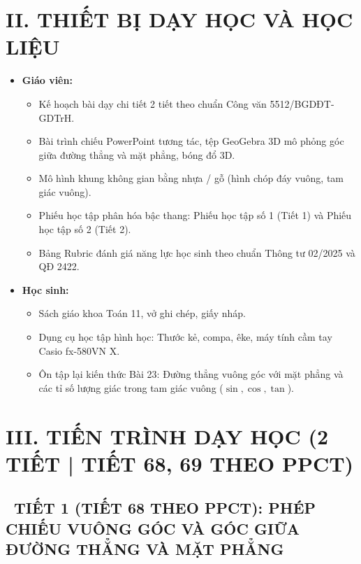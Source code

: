 \documentclass[12pt, a4paper]{article}
\begin{document}
\vspace{5pt}

\section*{II. THIẾT BỊ DẠY HỌC VÀ HỌC LIỆU}

\begin{itemize}[leftmargin=1.2cm]
    \item \textbf{Giáo viên:}
    \begin{itemize}[leftmargin=0.6cm]
        \item Kế hoạch bài dạy chi tiết 2 tiết theo chuẩn Công văn 5512/BGDĐT-GDTrH.
        \item Bài trình chiếu PowerPoint tương tác, tệp GeoGebra 3D mô phỏng góc giữa đường thẳng và mặt phẳng, bóng đổ 3D.
        \item Mô hình khung không gian bằng nhựa / gỗ (hình chóp đáy vuông, tam giác vuông).
        \item Phiếu học tập phân hóa bậc thang: Phiếu học tập số 1 (Tiết 1) và Phiếu học tập số 2 (Tiết 2).
        \item Bảng Rubric đánh giá năng lực học sinh theo chuẩn Thông tư 02/2025 và QĐ 2422.
    \end{itemize}
    \item \textbf{Học sinh:}
    \begin{itemize}[leftmargin=0.6cm]
        \item Sách giáo khoa Toán 11, vở ghi chép, giấy nháp.
        \item Dụng cụ học tập hình học: Thước kẻ, compa, êke, máy tính cầm tay Casio fx-580VN X.
        \item Ôn tập lại kiến thức Bài 23: Đường thẳng vuông góc với mặt phẳng và các tỉ số lượng giác trong tam giác vuông ($\sin, \cos, \tan$).
    \end{itemize}
\end{itemize}

\vspace{5pt}

\section*{III. TIẾN TRÌNH DẠY HỌC (2 TIẾT | TIẾT 68, 69 THEO PPCT)}

\subsection*{\faClockO \ TIẾT 1 (TIẾT 68 THEO PPCT): PHÉP CHIẾU VUÔNG GÓC VÀ GÓC GIỮA ĐƯỜNG THẲNG VÀ MẶT PHẲNG}
\end{document}
